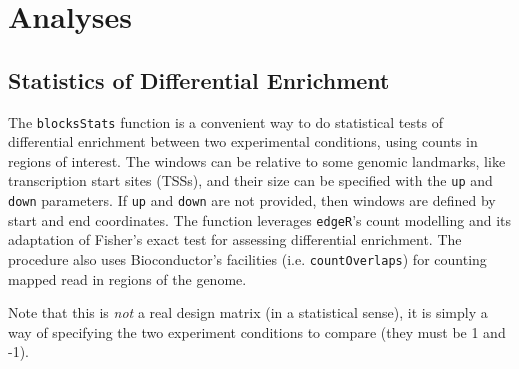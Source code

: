 \documentclass[a4paper, 12pt]{article}
\begin{document}



\section{Analyses}

\subsection{Statistics of Differential Enrichment}
The \texttt{blocksStats} function is a convenient way to do statistical tests of differential enrichment between two experimental conditions, using counts in regions of interest. The windows can be relative to some genomic landmarks, like transcription start sites (TSSs), and their size can be specified with the \texttt{up} and \texttt{down} parameters. If \texttt{up} and \texttt{down} are not provided, then windows are defined by start and end coordinates. The function leverages \texttt{edgeR}'s count modelling and its adaptation of Fisher's exact test for assessing differential enrichment.  The procedure also uses Bioconductor's facilities (i.e. \texttt{countOverlaps}) for counting mapped read in regions of the genome.



\noindent Note that this is {\em not} a real design matrix (in a statistical sense), it is simply a way of specifying the two experiment conditions to compare (they must be 1 and -1). \\
\end{document}
